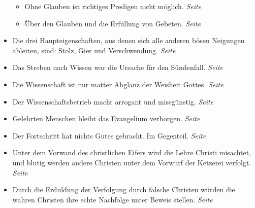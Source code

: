 \begin{itemize}
\begin{itemize}
 \item Ohne Glauben ist richtiges Predigen nicht möglich.
 \dotfill \textit{Seite~\pageref{ref:06_14_predigt}}\\

 \item Über den Glauben und die Erfüllung von Gebeten.
 \dotfill \textit{Seite~\pageref{ref:06_14_gebetserfuellung}}\\

 \end{itemize}

 \item Die drei Haupteigenschaften, aus denen sich alle anderen bösen Neigungen
ableiten, sind: Stolz, Gier und Verschwendung.
 \dotfill \textit{Seite
\pageref{ref:07_01_drei_haupteigenschaften}}\\

 \item Das Streben nach Wissen war die Ursache für den Sündenfall.
 \dotfill \textit{Seite~\pageref{ref:07_03_wissen_erbsuende}}\\

 \item Die Wissenschaft ist nur matter Abglanz der Weisheit Gottes.
 \dotfill \textit{Seite~\pageref{ref:07_03_wissen_erbsuende}}\\

 \item Der Wissenschaftsbetrieb macht arrogant und missgünstig.
 \dotfill \textit{Seite~\pageref{ref:07_06_wissenschaft}}\\

 \item Gelehrten Menschen bleibt das Evangelium verborgen.
 \dotfill \textit{Seite~\pageref{ref:07_13_gelehrte}}\\

 \item Der Fortschritt hat nichts Gutes gebracht. Im Gegenteil.
 \dotfill \textit{Seite~\pageref{ref:07_14_vortschritt}}\\

 \item Unter dem Vorwand des christlichen Eifers wird die Lehre Christi
misachtet, und blutig werden andere Christen unter dem Vorwurf der Ketzerei verfolgt.
 \dotfill \textit{Seite~\pageref{ref:07_14_ketzer}}\\

 \item Durch die Erduldung der Verfolgung durch falsche Christen würden die
wahren Christen ihre echte Nachfolge unter Beweis stellen.
 \dotfill \textit{Seite~\pageref{ref:07_16_vervolgung}}\\


\end{itemize}
